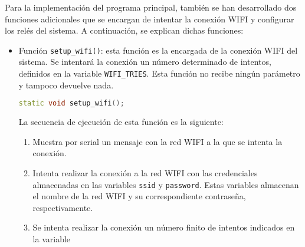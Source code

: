 Para la implementación del programa principal, también se han desarrollado dos funciones adicionales que se encargan de intentar la conexión WIFI y configurar los relés del sistema. A continuación, se explican dichas funciones:

\begin{itemize}
    \item Función \texttt{setup\_wifi()}: esta función es la encargada de la conexión WIFI del sistema. Se intentará la conexión un número determinado de intentos, definidos en la variable \texttt{WIFI\_TRIES}. Esta función no recibe ningún parámetro y tampoco devuelve nada.
    \begin{lstlisting}[captionpos=b, caption={Definición función setup\_wifi}, language=c++]
        static void setup_wifi();
    \end{lstlisting}
    La secuencia de ejecución de esta función es la siguiente:
    \begin{enumerate}
        \item Muestra por serial un mensaje con la red WIFI a la que se intenta la conexión.
        \item Intenta realizar la conexión a la red WIFI con las credenciales almacenadas en las variables \texttt{ssid} y \texttt{password}. Estas variables almacenan el nombre de la red WIFI y su correspondiente contraseña, respectivamente.
        \item Se intenta realizar la conexión un número finito de intentos indicados en la variable


\end{enumerate}
\end{itemize}
